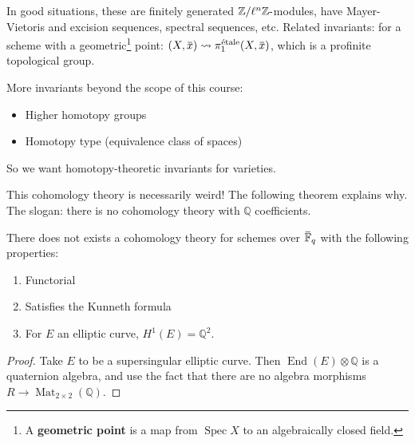 In good situations, these are finitely generated
\({\mathbb{Z}}/\ell^n{\mathbb{Z}}{\hbox{-}}\)modules, have
Mayer-Vietoris and excision sequences, spectral sequences, etc. Related
invariants: for a scheme with a geometric\footnote{A \textbf{geometric
  point} is a map from \(\operatorname{Spec}X\) to an algebraically
  closed field.} point:
\((X, \mkern 1.5mu\overline{\mkern-1.5mux\mkern-1.5mu}\mkern 1.5mu) \rightsquigarrow \pi_1^{\text{étale}}(X, \mkern 1.5mu\overline{\mkern-1.5mux\mkern-1.5mu}\mkern 1.5mu)\),
which is a profinite topological group.

\begin{remark}

More invariants beyond the scope of this course:

\begin{itemize}
\tightlist
\item
  Higher homotopy groups
\item
  Homotopy type (equivalence class of spaces)
\end{itemize}

So we want homotopy-theoretic invariants for varieties.

\end{remark}

\begin{remark}

This cohomology theory is necessarily weird! The following theorem
explains why. The slogan: there is no cohomology theory with
\({\mathbb{Q}}\) coefficients.

\end{remark}

\begin{theorem}[Serre]

There does not exists a cohomology theory for schemes over
\(\mkern 1.5mu\overline{\mkern-1.5mu{\mathbb{F}}\mkern-1.5mu}\mkern 1.5mu_q\)
with the following properties:

\begin{enumerate}
\def\labelenumi{\arabic{enumi}.}
\tightlist
\item
  Functorial
\item
  Satisfies the Kunneth formula
\item
  For \(E\) an elliptic curve, \(H^1(E) = {\mathbb{Q}}^2\).
\end{enumerate}

\end{theorem}

\begin{proof}

Take \(E\) to be a supersingular elliptic curve. Then
\(\operatorname{End}(E) \otimes{\mathbb{Q}}\) is a quaternion algebra,
and use the fact that there are no algebra morphisms
\(R\to \operatorname{Mat}_{2\times 2}({\mathbb{Q}})\).

\end{proof}

